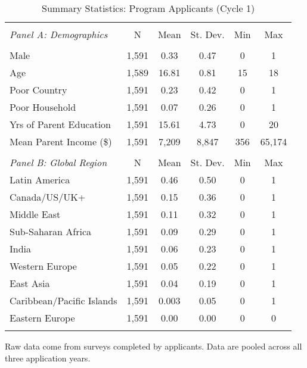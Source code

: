     
    \newpage
    
    \begin{table}[!htbp] \centering 
     \begin{adjustbox}{width=\textwidth, totalheight=\baselineskip,keepaspectratio}
    \begin{threeparttable}
      \caption{Summary Statistics: Program Applicants (Cycle 1)}\label{tab:c1_demo}
      \label{} 
    \begin{tabular}{@{\extracolsep{5pt}}lccccc} 
    \\[-1.8ex]\hline 
    \hline \\[-1.8ex] 
    \emph{Panel A: Demographics} & \multicolumn{1}{c}{N} & \multicolumn{1}{c}{Mean} & \multicolumn{1}{c}{St. Dev.} & \multicolumn{1}{c}{Min} & \multicolumn{1}{c}{Max} \\ 
    \hline \\[-1.8ex] 
    Male & 1,591 & 0.33 & 0.47 & 0 & 1 \\ 
    Age & 1,589 & 16.81 & 0.81 & 15 & 18 \\ 
    Poor Country & 1,591 & 0.23 & 0.42 & 0 & 1 \\ 
    Poor Household & 1,591 & 0.07 & 0.26 & 0 & 1 \\ 
    Yrs of Parent Education & 1,591 & 15.61 & 4.73 & 0 & 20 \\ 
    Mean Parent Income (\$) & 1,591 & 7,209 & 8,847 & 356 & 65,174 \\ 
    \hline
    & & & & & \\
    \emph{Panel B: Global Region} & \multicolumn{1}{c}{N} & \multicolumn{1}{c}{Mean} & \multicolumn{1}{c}{St. Dev.} & \multicolumn{1}{c}{Min} & \multicolumn{1}{c}{Max} \\ 
    \hline
    Latin America & 1,591 & 0.46 & 0.50 & 0 & 1 \\ 
    Canada/US/UK+ & 1,591 & 0.15 & 0.36 & 0 & 1 \\ 
    Middle East & 1,591 & 0.11 & 0.32 & 0 & 1 \\ 
    Sub-Saharan Africa & 1,591 & 0.09 & 0.29 & 0 & 1 \\ 
    India & 1,591 & 0.06 & 0.23 & 0 & 1 \\ 
    Western Europe & 1,591 & 0.05 & 0.22 & 0 & 1 \\ 
    East Asia & 1,591 & 0.04 & 0.19 & 0 & 1 \\ 
    Caribbean/Pacific Islands & 1,591 & 0.003 & 0.05 & 0 & 1 \\ 
    Eastern Europe & 1,591 & 0.00 & 0.00 & 0 & 0 \\ 
    \hline \hline \\[-1.8ex] 
    \end{tabular} 
            \end{threeparttable}
        \end{adjustbox}
              \begin{notes}
                       Raw data come from surveys completed by applicants. Data are pooled across all three application years. 
                \end{notes}
    \end{table} 
    
